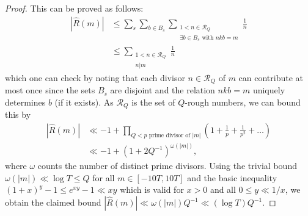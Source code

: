 \documentclass[11pt, reqno]{amsart}
\begin{document}
\begin{proof}
This can be proved as follows: \begin{align*}
    |\hat{R}(m)|&\leqslant \sum_s\sum_{b\in B_s}\sum_{\substack{1<n\in\mathcal{R}_Q\\\exists b\in B_s \text{ with }nkb=  m}}\frac{1}{n}\\
    &\leqslant \sum_{\substack{1<n\in\mathcal{R}_Q\\ n| m}}\frac{1}{n}
\end{align*}
which one can check by noting that each divisor $n\in\mathcal{R}_Q$ of $m$ can contribute at most once since the sets $B_s$ are disjoint and the relation $nkb=m$ uniquely determines $b$ (if it exists). As $\mathcal{R}_Q$ is the set of $Q$-rough numbers, we can bound this by
\begin{align*}
    |\hat{R}(m)|&\ll -1+\prod_{Q<p \text{ prime divisor of $|m|$}}\left(1+\frac{1}{p}+\frac{1}{p^2}+\dots\right)\\
    &\ll -1+\left(1+2Q^{-1}\right)^{\omega(|m|)},
\end{align*}
where $\omega$ counts the number of distinct prime divisors. Using the trivial bound $\omega(|m|)\ll \log T\leqslant Q$ for all $m\in[-10T,10T]$ and the basic inequality $(1+x)^y-1\leqslant e^{xy}-1\ll xy$ which is valid for $x>0$ and all $0\leqslant y \ll 1/x$, we obtain the claimed bound $|\hat{R}(m)|\ll \omega(|m|)Q^{-1}\ll (\log T)Q^{-1}$.
\end{proof}
\end{document}

